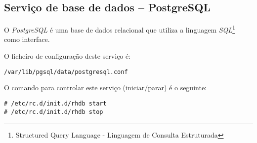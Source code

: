 \subsection{Serviço de base de dados -- PostgreSQL}

O \emph{PostgreSQL} é uma base de dados relacional que utiliza a linguagem
\emph{SQL}\footnote{Structured Query Language - Linguagem de Consulta Estruturada}
como interface.

O ficheiro de configuração deste serviço é:

\begin{Verbatim}[commandchars=\\\{\}]
/var/lib/pgsql/data/postgresql.conf
\end{Verbatim}

O comando para controlar este serviço (iniciar/parar) é o seguinte:

\begin{Verbatim}[commandchars=\\\{\}]
# /etc/rc.d/init.d/rhdb start
# /etc/rc.d/init.d/rhdb stop
\end{Verbatim}

